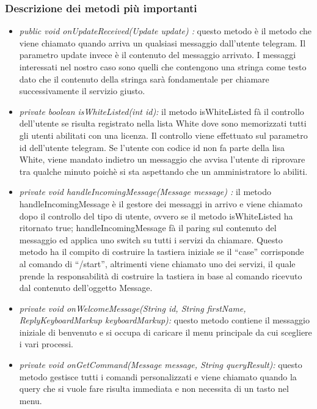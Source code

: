 \subsubsection{Descrizione dei metodi più importanti}


\begin{itemize}
\item \textit{public void onUpdateReceived(Update update) :}  
questo metodo è il metodo che viene chiamato quando arriva un qualsiasi messaggio dall’utente telegram. Il parametro update invece è il contenuto del messaggio arrivato. I messaggi interessati nel nostro caso sono quelli che contengono una stringa come testo dato che il contenuto della stringa sarà fondamentale per chiamare successivamente il servizio giusto.

\item \textit{private boolean isWhiteListed(int id):}
il metodo isWhiteListed fà il controllo dell’utente se risulta registrato nella lista White dove sono memorizzati tutti gli utenti abilitati con una licenza. Il controllo viene effettuato sul parametro id dell’utente telegram. Se l’utente con codice id non fa parte della lisa White, viene mandato indietro un messaggio che avvisa l’utente di riprovare tra qualche minuto poichè si sta aspettando che un amministratore lo abiliti. 

\item \textit{private void handleIncomingMessage(Message message) :}
il metodo handleIncomingMessage è il gestore dei messaggi in arrivo e viene chiamato dopo il controllo del tipo di utente, ovvero se il metodo isWhiteListed ha ritornato true; 
handleIncomingMessage fà il paring sul contenuto del messaggio ed applica uno switch su  tutti i servizi da chiamare. Questo metodo ha il compito di costruire la tastiera iniziale se il “case” corrisponde al comando di “/start”, altrimenti viene chiamato uno dei servizi, il quale prende la responsabilità di costruire la tastiera in base al comando ricevuto dal contenuto dell’oggetto Message.

	 \item \textit{private void onWelcomeMessage(String id, String firstName, ReplyKeyboardMarkup keyboardMarkup):} questo metodo contiene il messaggio iniziale di benvenuto e si occupa di caricare il menu principale da cui scegliere i vari processi. 

 \item \textit{private void onGetCommand(Message message, String queryResult):}
questo metodo gestisce tutti i comandi personalizzati e viene chiamato quando la query che si vuole fare risulta immediata e non necessita di un tasto nel menu.


\end{itemize}
